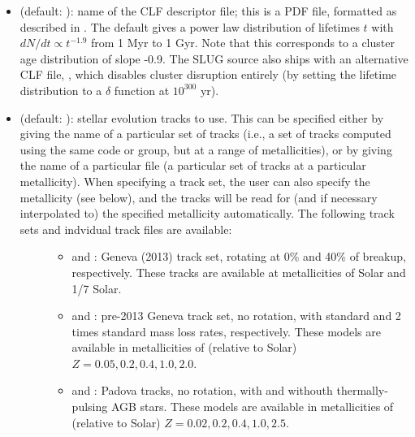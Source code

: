 \documentclass[letterpaper,10pt,english]{sphinxmanual}
\begin{document}
\begin{itemize}
\item {} 
 (default: ): name of the CLF descriptor file; this is a PDF file, formatted as described in {\hyperref[\detokenize{pdfs:sec-pdfs}]{}}. The default gives a power law distribution of lifetimes \(t\) with \(dN/dt\propto t^{-1.9}\) from 1 Myr to 1 Gyr. Note that this corresponds to a cluster age distribution of slope -0.9. The SLUG source also ships with an alternative CLF file, , which disables cluster disruption entirely (by setting the lifetime distribution to a \(\delta\) function at \(10^{300}\) yr).

\item {} \begin{description}
\item[{ (default: ): stellar evolution tracks to use. This can be specified either by giving the name of a particular set of tracks (i.e., a set of tracks computed using the same code or group, but at a range of metallicities), or by giving the name of a particular file (a particular set of tracks at a particular metallicity). When specifying a track set, the user can also specify the metallicity (see below), and the tracks will be read for (and if necessary interpolated to) the specified metallicity automatically. The following track sets and indvidual track files are available:}] \leavevmode\begin{itemize}
\item {} 
 and : Geneva (2013) track set, rotating at 0\% and 40\% of breakup, respectively. These tracks are available at metallicities of Solar and 1/7 Solar.

\item {} 
 and : pre-2013 Geneva track set, no rotation, with standard and 2 times standard mass loss rates, respectively. These models are available in metallicities of (relative to Solar) \(Z = 0.05, 0.2, 0.4, 1.0, 2.0\).

\item {} 
 and : Padova tracks, no rotation, with and withouth thermally-pulsing AGB stars. These models are available in metallicities of (relative to Solar) \(Z = 0.02, 0.2, 0.4, 1.0, 2.5\).


\end{itemize}
\end{description}
\end{itemize}
\end{document}

